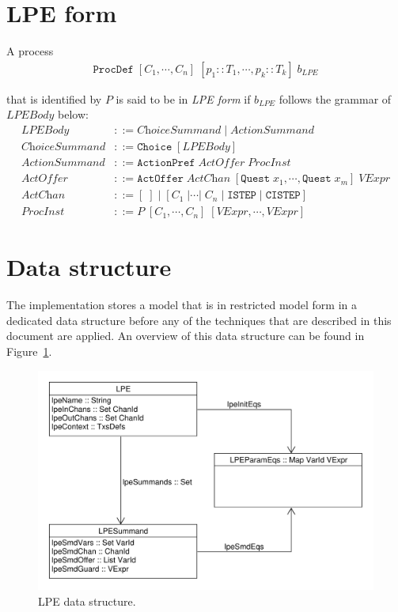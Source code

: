 \section{LPE form} \label{sec:lpeform}

A \txs{} process
\begin{align*}
\texttt{ProcDef} \; [C_1, \cdots{}, C_n] \; [p_1 :: T_1, \cdots{}, p_k :: T_k] \; b_\textit{LPE}
\end{align*}

that is identified by $P$ is said to be in \emph{LPE form} if $b_\textit{LPE}$ follows the grammar of $\textit{LPEBody}$ below:
\begin{align*}
\textit{LPEBody} &::= \textit{ChoiceSummand} \;|\; \textit{ActionSummand} \\
\textit{ChoiceSummand} &::= \texttt{Choice} \; [ \textit{LPEBody} ] \\
\textit{ActionSummand} &::= \texttt{ActionPref} \; \textit{ActOffer} \; \textit{ProcInst} \\
\textit{ActOffer} &::= \texttt{ActOffer} \; \textit{ActChan} \; [\texttt{Quest} \; x_1, \cdots{}, \texttt{Quest} \; x_m] \; \textit{VExpr} \\
\textit{ActChan} &::= [\;] \;|\; [C_1 \;| \cdots{} |\; C_n \;|\; \texttt{ISTEP} \;|\; \texttt{CISTEP}] \\
\textit{ProcInst} &::= P \; [C_1, \cdots{}, C_n] \; [\textit{VExpr}, \cdots{}, \textit{VExpr}]
\end{align*}

\section{Data structure}

The implementation stores a \txs{} model that is in restricted model form in a dedicated data structure before any of the techniques that are described in this document are applied.
An overview of this data structure can be found in Figure~\ref{fig:lpedatastructure}.

\begin{figure}[!ht]
\begin{center}
\includegraphics[width=0.7\linewidth]{images/lpe-types}
\caption{LPE data structure.}
\label{fig:lpedatastructure}
\end{center}
\end{figure}


